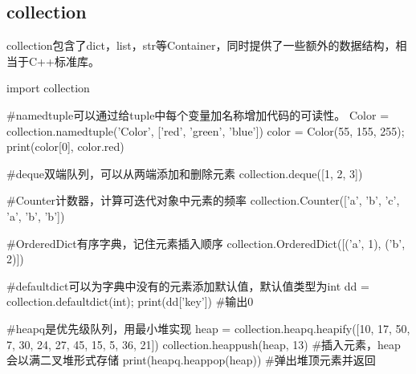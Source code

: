   \subsection{collection}
    collection包含了dict，list，str等Container，同时提供了一些额外的数据结构，相当于C++标准库。
    \begin{codeblock}[language=python, caption={namedtuple}]
      import collection

      #namedtuple可以通过给tuple中每个变量加名称增加代码的可读性。
      Color = collection.namedtuple('Color', ['red', 'green', 'blue'])
      color = Color(55, 155, 255); print(color[0], color.red)

      #deque双端队列，可以从两端添加和删除元素
      collection.deque([1, 2, 3])

      #Counter计数器，计算可迭代对象中元素的频率
      collection.Counter(['a', 'b', 'c', 'a', 'b', 'b'])

      #OrderedDict有序字典，记住元素插入顺序
      collection.OrderedDict([('a', 1), ('b', 2)])
      
      #defaultdict可以为字典中没有的元素添加默认值，默认值类型为int
      dd = collection.defaultdict(int); print(dd['key']) #输出0 
      
      #heapq是优先级队列，用最小堆实现
      heap = collection.heapq.heapify([10, 17, 50, 7, 30, 24, 27, 45, 15, 5, 36, 21])
      collection.heappush(heap, 13) #插入元素，heap会以满二叉堆形式存储
      print(heapq.heappop(heap)) #弹出堆顶元素并返回
    \end{codeblock}

